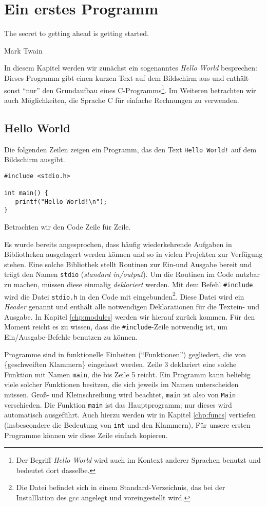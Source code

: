\chapter{Ein erstes Programm}
\epigraph{The secret to getting ahead is getting started.}{Mark Twain}
In diesem Kapitel werden wir zunächst ein sogenanntes \emph{Hello World} besprechen: Dieses Programm gibt einen kurzen Text auf dem Bildschirm aus und enthält sonst \enquote{nur} den Grundaufbau eines C-Programms\footnote{Der Begriff \emph{Hello World} wird auch im Kontext anderer Sprachen benutzt und bedeutet dort dasselbe.}. Im Weiteren betrachten wir auch Möglichkeiten, die Sprache C für einfache Rechnungen zu verwenden.

\section{Hello World}
Die folgenden Zeilen zeigen ein Programm, das den Text \texttt{Hello World!} auf dem Bildschirm ausgibt.
\begin{codebox}
\begin{verbatim}
#include <stdio.h>

int main() {
   printf("Hello World!\n");
}
\end{verbatim}
\end{codebox}
Betrachten wir den Code Zeile für Zeile.

Es wurde bereits angesprochen, dass häufig wiederkehrende Aufgaben in Bibliotheken ausgelagert werden können und so in vielen Projekten zur Verfügung stehen. Eine solche Bibliothek stellt Routinen zur Ein-und Ausgabe bereit und trägt den Namen \texttt{stdio} (\emph{standard in/output}). Um die Routinen im Code nutzbar zu machen, müssen diese einmalig \emph{deklariert} werden. Mit dem Befehl \texttt{#include} wird die Datei \texttt{stdio.h} in den Code mit eingebunden\footnote{Die Datei befindet sich in einem Standard-Verzeichnis, das bei der Installlation des gcc angelegt und voreingestellt wird.}. Diese Datei wird ein \emph{Header} genannt und enthält alle notwendigen Deklarationen für die Textein- und Ausgabe. In Kapitel \ref{chp:modules} werden wir hierauf zurück kommen. Für den Moment reicht es zu wissen, dass die \texttt{#include}-Zeile notwendig ist, um Ein/Ausgabe-Befehle benutzen zu können.

Programme sind in funktionelle Einheiten (\enquote{Funktionen}) gegliedert, die von \{geschweiften Klammern\} eingefasst werden. Zeile 3 deklariert eine solche Funktion mit Namen \texttt{main}, die bis Zeile 5 reicht. Ein Programm kann beliebig viele solcher Funktionen besitzen, die sich jeweils im Namen unterscheiden müssen. Groß- und Kleinschreibung wird beachtet, \texttt{main} ist also von \texttt{Main} verschieden. Die Funktion \texttt{main} ist das Hauptprogramm; nur dieses wird automatisch ausgeführt. Auch hierzu werden wir in Kapitel \ref{chp:funcs} vertiefen (insbeseondere die Bedeutung von \texttt{int} und den Klammern). Für unsere ersten Programme können wir diese Zeile einfach kopieren.

